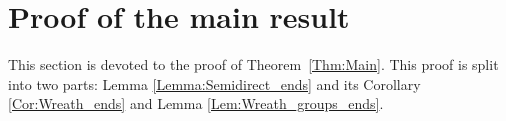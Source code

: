 %
%
%
%
%
%
%
%
%
%
\section{Proof of the main result}
\label{Section:Proof}
%
%
%
%
%
This section is devoted to the proof of Theorem~\ref{Thm:Main}. This proof is split into two parts: Lemma \ref{Lemma:Semidirect_ends} and its Corollary \ref{Cor:Wreath_ends} and Lemma \ref{Lem:Wreath_groups_ends}.


